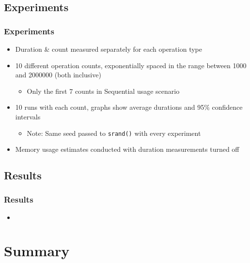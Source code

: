 \documentclass{beamer}
\begin{document}
\subsection{Experiments}


\begin{frame}
\frametitle{Experiments}
\begin{itemize}

  \item Duration \& count measured separately for each operation type

  \item 10 different operation counts, exponentially spaced in the range between
  1000 and 2000000 (both inclusive)

  \begin{itemize}
    \item Only the first 7 counts in Sequential usage scenario
  \end{itemize}

  \item 10 runs with each count, graphs show average durations and 95\%
  confidence intervals
  \begin{itemize}
    \item Note: Same seed passed to \texttt{srand()} with every experiment
  \end{itemize}

  \item Memory usage estimates conducted with duration measurements turned off

\end{itemize}
\end{frame}

\subsection{Results}
\begin{frame}
\frametitle{Results}
\begin{itemize}
  \item 
\end{itemize}
\end{frame}


\section*{Summary}
\end{document}
